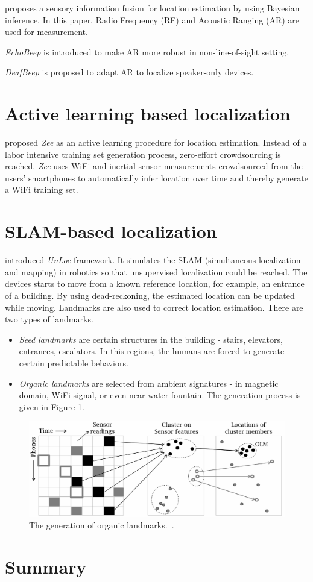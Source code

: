 \documentclass[letterpaper]{article}
\begin{document}
\cite{Nandakumar:2012:CLD:2348543.2348579} proposes a sensory information fusion for location estimation by using Bayesian inference.
In this paper, Radio Frequency (RF) and Acoustic Ranging (AR) are used for measurement.

\emph{EchoBeep} is introduced to make AR more robust in non-line-of-sight setting.

\emph{DeafBeep} is proposed to adapt AR to localize speaker-only devices.

\section{Active learning based localization}

\cite{Rai:2012:ZZC:2348543.2348580} proposed \emph{Zee} as an active learning procedure for location estimation.
Instead of a labor intensive training set generation process, zero-effort crowdsourcing is reached.
\emph{Zee} uses WiFi and inertial sensor measurements crowdsourced from the users' smartphones to automatically infer location over time and thereby generate a WiFi training set.



\section{SLAM-based localization}

\cite{Wang:2012:NNW:2307636.2307655} introduced \emph{UnLoc} framework.
It simulates the SLAM (simultaneous localization and mapping) in robotics so that unsupervised localization could be reached.
The devices starts to move from a known reference location, for example, an entrance of a building.
By using dead-reckoning, the estimated location can be updated while moving.
Landmarks are also used to correct location estimation.
There are two types of landmarks.
\begin{itemize}
	\item \emph{Seed landmarks} are certain structures in the building - stairs, elevators, entrances, escalators.
	In this regions, the humans are forced to generate certain predictable behaviors.
	\item \emph{Organic landmarks} are selected from ambient signatures - in magnetic domain, WiFi signal, or even near water-fountain.
	The generation process is given in Figure \ref{fig:olm}.
\end{itemize}
\begin{figure}
	\centering
	\includegraphics[width=0.9\linewidth]{fig/OLM.png}
	\caption{The generation of organic landmarks.~\cite{Wang:2012:NNW:2307636.2307655}.}
	\label{fig:olm}
\end{figure}


\section{Summary}



\end{document}
